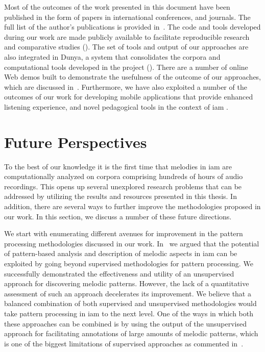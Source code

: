 Most of the outcomes of the work presented in this document have been published in the form of papers in international conferences, and journals. The full list of the author’s publications is provided in~. The code and tools developed during our work are made publicly available to facilitate reproducible research and comparative studies (). The set of tools and output of our approaches are also integrated in Dunya, a system that consolidates the corpora and computational tools developed in the project (). There are a number of online Web demos built to demonstrate the usefulness of the outcome of our approaches, which are discussed in~. Furthermore, we have also exploited a number of the outcomes of our work for developing mobile applications that provide enhanced listening experience, and novel pedagogical tools in the context of \gls{iam} .


\section{Future Perspectives}
\label{sec:future_directions}

To the best of our knowledge it is the first time that melodies in \gls{iam} are computationally analyzed on corpora comprising hundreds of hours of audio recordings. This opens up several unexplored research problems that can be addressed by utilizing the results and resources presented in this thesis. In addition, there are several ways to further improve the methodologies proposed in our work. In this section, we discuss a number of these future directions. 

We start with enumerating different avenues for improvement in the pattern processing methodologies discussed in our work. In~ we argued that the potential of pattern-based analysis and description of melodic aspects in \gls{iam} can be exploited by going beyond supervised methodologies for pattern processing. We successfully demonstrated the effectiveness and utility of an unsupervised approach for discovering melodic patterns. However, the lack of a quantitative assessment of such an approach decelerates its improvement. We believe that a balanced combination of both supervised and unsupervised methodologies would take pattern processing in \gls{iam} to the next level. One of the ways in which both these approaches can be combined is by using the output of the unsupervised approach for facilitating annotations of large amounts of melodic patterns, which is one of the biggest limitations of supervised approaches as commented in~.

